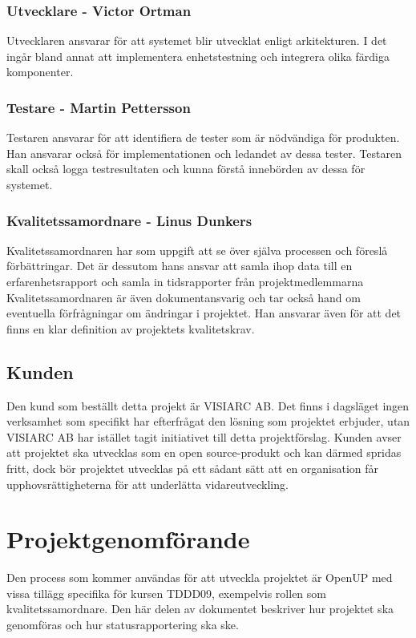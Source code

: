 \subsubsection*{Utvecklare - Victor Ortman}
Utvecklaren ansvarar för att systemet blir utvecklat enligt arkitekturen. I det ingår bland annat att implementera enhetstestning och integrera olika färdiga komponenter.

\subsubsection*{Testare - Martin Pettersson}
Testaren ansvarar för att identifiera de tester som är nödvändiga för produkten. Han ansvarar också för implementationen och ledandet av dessa tester. Testaren skall också logga testresultaten och kunna förstå innebörden av dessa för systemet.

\subsubsection*{Kvalitetssamordnare - Linus Dunkers}
Kvalitetssamordnaren har som uppgift att se över själva processen och föreslå förbättringar. Det är dessutom hans ansvar att samla ihop data till en erfarenhetsrapport och samla in tidsrapporter från projektmedlemmarna Kvalitetssamordnaren är även dokumentansvarig och tar också hand om eventuella förfrågningar om ändringar i projektet. Han ansvarar även för att det finns en klar definition av projektets kvalitetskrav.

\subsection{Kunden}
Den kund som beställt detta projekt är VISIARC AB. Det finns i dagsläget ingen verksamhet som specifikt har efterfrågat den lösning som projektet erbjuder, utan VISIARC AB har istället tagit initiativet till detta projektförslag. Kunden avser att projektet ska utvecklas som en open source-produkt och kan därmed spridas fritt, dock bör projektet utvecklas på ett sådant sätt att en organisation får upphovsrättigheterna för att underlätta vidareutveckling.

\section{Projektgenomförande}
Den process som kommer användas för att utveckla projektet är OpenUP\cite{openup} med vissa tillägg specifika för kursen TDDD09, exempelvis rollen som kvalitetssamordnare\cite{sandahl}. Den här delen av dokumentet beskriver hur projektet ska genomföras och hur statusrapportering ska ske.

